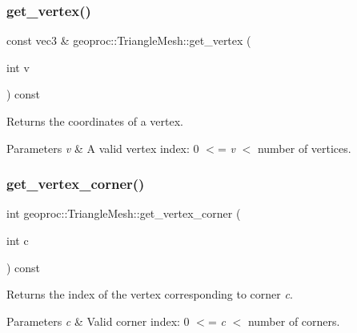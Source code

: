 \subsubsection{\texorpdfstring{get\+\_\+vertex()}{get\_vertex()}}
{\footnotesize\ttfamily const vec3 \& geoproc\+::\+Triangle\+Mesh\+::get\+\_\+vertex (\begin{DoxyParamCaption}\item[{int}]{v }\end{DoxyParamCaption}) const}



Returns the coordinates of a vertex. 


\begin{DoxyParams}{Parameters}
{\em v} & A valid vertex index\+: 0 $<$= {\itshape v} $<$ number of vertices. \\
\hline
\end{DoxyParams}
\mbox{\label{classgeoproc_1_1TriangleMesh_aba03ea01f69c0888e0aae17ec330d31d}} 
\subsubsection{\texorpdfstring{get\+\_\+vertex\+\_\+corner()}{get\_vertex\_corner()}}
{\footnotesize\ttfamily int geoproc\+::\+Triangle\+Mesh\+::get\+\_\+vertex\+\_\+corner (\begin{DoxyParamCaption}\item[{int}]{c }\end{DoxyParamCaption}) const}



Returns the index of the vertex corresponding to corner {\itshape c}. 


\begin{DoxyParams}{Parameters}
{\em c} & Valid corner index\+: 0 $<$= {\itshape c} $<$ number of corners. \\
\hline
\end{DoxyParams}
\mbox{\label{classgeoproc_1_1TriangleMesh_ae73a760e61250eb2f474b8ab03a1e2ab}} 
